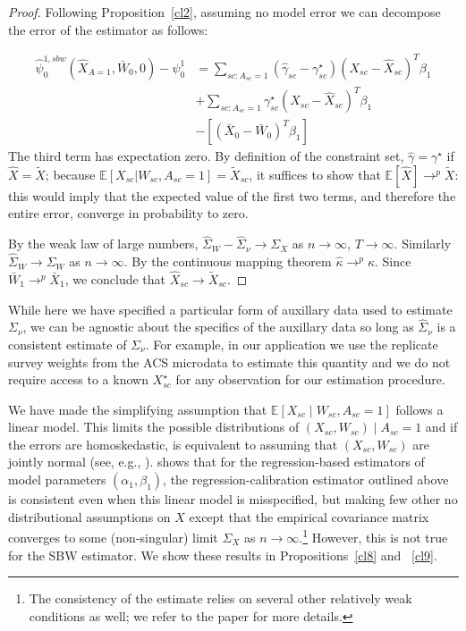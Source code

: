 \begin{proof}
Following Proposition~\ref{cl2}, assuming no model error we can decompose the error of the estimator as follows:

\begin{align*}\nonumber
    \hat{\psi}^{1, sbw}_0(\hat{X}_{A=1}, \bar{W}_0, 0) - \psi_0^1 &= \sum_{sc: A_{sc} = 1}(\hat{\gamma}_{sc} - \gamma_{sc}^\star)(X_{sc} - \hat{X}_{sc})^T\beta_1 \\
    & + \sum_{sc: A_{sc} = 1}\gamma_{sc}^\star(X_{sc} - \hat{X}_{sc})^T\beta_1 \\
    &- [(\bar{X}_0 - \bar{W}_0)^T\beta_1]
\end{align*}
%
The third term has expectation zero. By definition of the constraint set, $\hat{\gamma} = \gamma^\star$ if $\hat{X} = \tilde{X}$; because $\mathbb{E}[X_{sc} | W_{sc}, A_{sc} = 1] = \tilde{X}_{sc}$, it suffices to show that $\mathbb{E}[\hat{X}] \to^p \tilde{X}$: this would imply that the expected value of the first two terms, and therefore the entire error, converge in probability to zero.

By the weak law of large numbers, $\hat{\Sigma}_W - \hat{\Sigma}_{\nu} \to \Sigma_{X}$ as $n \to \infty$, $T \to \infty$. Similarly $\hat{\Sigma}_W \to \Sigma_W$ as $n \to \infty$. By the continuous mapping theorem $\hat{\kappa} \to^p \kappa$. Since $\bar{W}_1 \to^p \bar{X}_1$, we conclude that $\hat{X}_{sc} \to \tilde{X}_{sc}$. 
\end{proof}

\begin{remark}
    While here we have specified a particular form of auxillary data used to estimate $\Sigma_{\nu}$, we can be agnostic about the specifics of the auxillary data so long as $\hat{\Sigma}_{\nu}$ is a consistent estimate of $\Sigma_{\nu}$. For example, in our application we use the replicate survey weights from the ACS microdata to estimate this quantity and we do not require access to a known $X_{sc}^\star$ for any observation for our estimation procedure.
\end{remark}

\begin{remark}
    We have made the simplifying assumption that $\mathbb{E}[X_{sc} \mid W_{sc}, A_{sc} = 1]$ follows a linear model. This limits the possible distributions of $(X_{sc}, W_{sc}) \mid A_{sc} = 1$ and if the errors are homoskedastic, is equivalent to assuming that $(X_{sc}, W_{sc})$ are jointly normal (see, e.g., \cite{gleser1992importance}). \cite{gleser1992importance} shows that for the regression-based estimators of model parameters $(\alpha_1, \beta_1)$, the regression-calibration estimator outlined above is consistent even when this linear model is misspecified, but making few other no distributional assumptions on $X$ except that the empirical covariance matrix converges to some (non-singular) limit $\Sigma_X$ as $n \to \infty$.\footnote{The consistency of the estimate relies on several other relatively weak conditions as well; we refer to the paper for more details.} However, this is not true for the SBW estimator. We show these results in Propositions~\ref{cl8} and ~\ref{cl9}.
\end{remark}

